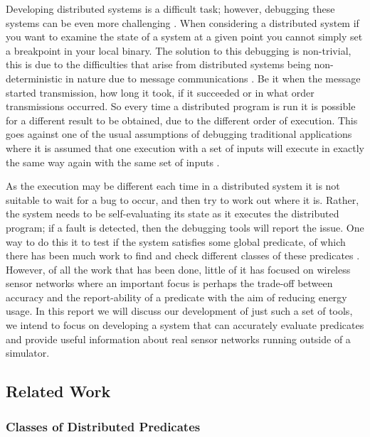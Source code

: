 Developing distributed systems is a difficult task; however, debugging these systems can be even more challenging \cite{345831}. When considering a distributed system if you want to examine the state of a system at a given point you cannot simply set a breakpoint in your local binary. The solution to this debugging is non-trivial, this is due to the difficulties that arise from distributed systems being non-deterministic in nature due to message communications \cite{1676929,Fagerstrom:1988:DTD:55823.55833}. Be it when the message started transmission, how long it took, if it succeeded or in what order transmissions occurred. So every time a distributed program is run it is possible for a different result to be obtained, due to the different order of execution. This goes against one of the usual assumptions of debugging traditional applications where it is assumed that one execution with a set of inputs will execute in exactly the same way again with the same set of inputs \cite[Chapter~10]{lethbridge2001object}.

As the execution may be different each time in a distributed system it is not suitable to wait for a bug to occur, and then try to work out where it is. Rather, the system needs to be self-evaluating its state as it executes the distributed program; if a fault is detected, then the debugging tools will report the issue. One way to do this it to test if the system satisfies some global predicate, of which there has been much work to find and check different classes of these predicates \cite{553309,345831,277788}. However, of all the work that has been done, little of it has focused on wireless sensor networks where an important focus is perhaps the trade-off between accuracy and the report-ability of a predicate with the aim of reducing energy usage. In this report we will discuss our development of just such a set of tools, we intend to focus on developing a system that can accurately evaluate predicates and provide useful information about real sensor networks running outside of a simulator.

\subsection{Related Work}

\subsubsection{Classes of Distributed Predicates}

